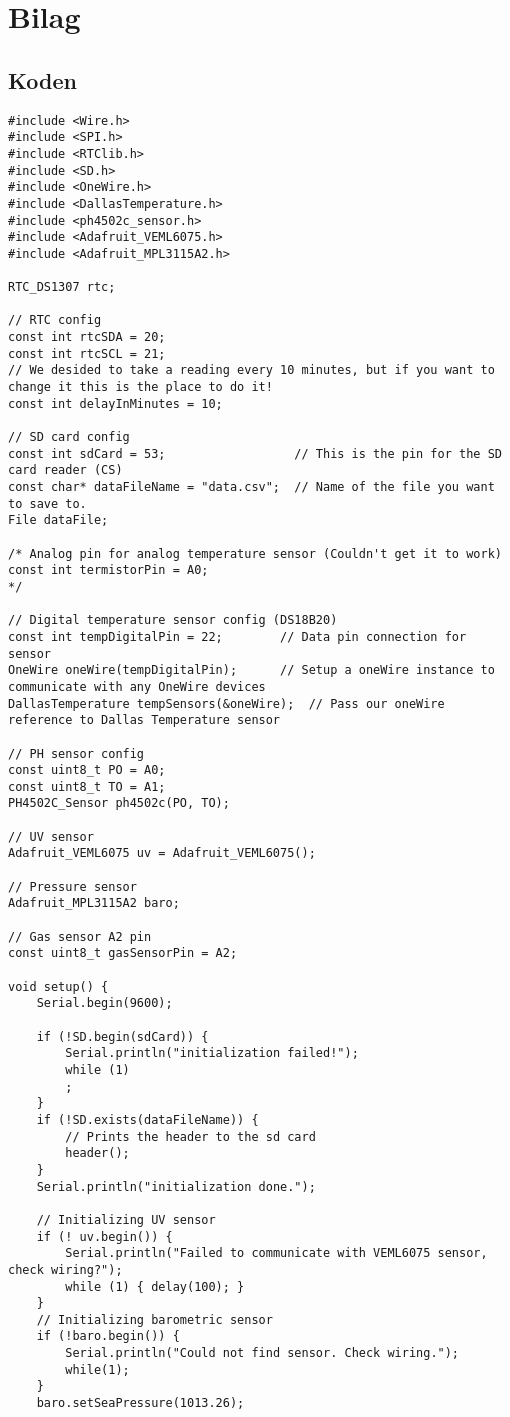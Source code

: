 \section{Bilag}
	\subsection{Koden}\label{sec:Koden}
		\begin{lstlisting}
#include <Wire.h>
#include <SPI.h>
#include <RTClib.h>
#include <SD.h>
#include <OneWire.h>
#include <DallasTemperature.h>
#include <ph4502c_sensor.h>
#include <Adafruit_VEML6075.h>
#include <Adafruit_MPL3115A2.h>

RTC_DS1307 rtc;

// RTC config
const int rtcSDA = 20;
const int rtcSCL = 21;
// We desided to take a reading every 10 minutes, but if you want to change it this is the place to do it!
const int delayInMinutes = 10;

// SD card config
const int sdCard = 53;                  // This is the pin for the SD card reader (CS)
const char* dataFileName = "data.csv";  // Name of the file you want to save to.
File dataFile;

/* Analog pin for analog temperature sensor (Couldn't get it to work)
const int termistorPin = A0;
*/

// Digital temperature sensor config (DS18B20)
const int tempDigitalPin = 22;        // Data pin connection for sensor
OneWire oneWire(tempDigitalPin);      // Setup a oneWire instance to communicate with any OneWire devices
DallasTemperature tempSensors(&oneWire);  // Pass our oneWire reference to Dallas Temperature sensor

// PH sensor config
const uint8_t PO = A0;
const uint8_t TO = A1;
PH4502C_Sensor ph4502c(PO, TO);

// UV sensor
Adafruit_VEML6075 uv = Adafruit_VEML6075();

// Pressure sensor
Adafruit_MPL3115A2 baro;

// Gas sensor A2 pin
const uint8_t gasSensorPin = A2;

void setup() {
	Serial.begin(9600);
	
	if (!SD.begin(sdCard)) {
		Serial.println("initialization failed!");
		while (1)
		;
	}
	if (!SD.exists(dataFileName)) {
		// Prints the header to the sd card
		header();
	}
	Serial.println("initialization done.");
	
	// Initializing UV sensor
	if (! uv.begin()) {
		Serial.println("Failed to communicate with VEML6075 sensor, check wiring?");
		while (1) { delay(100); }
	}
	// Initializing barometric sensor
	if (!baro.begin()) {
		Serial.println("Could not find sensor. Check wiring.");
		while(1);
	}
	baro.setSeaPressure(1013.26);
	

\end{lstlisting}
